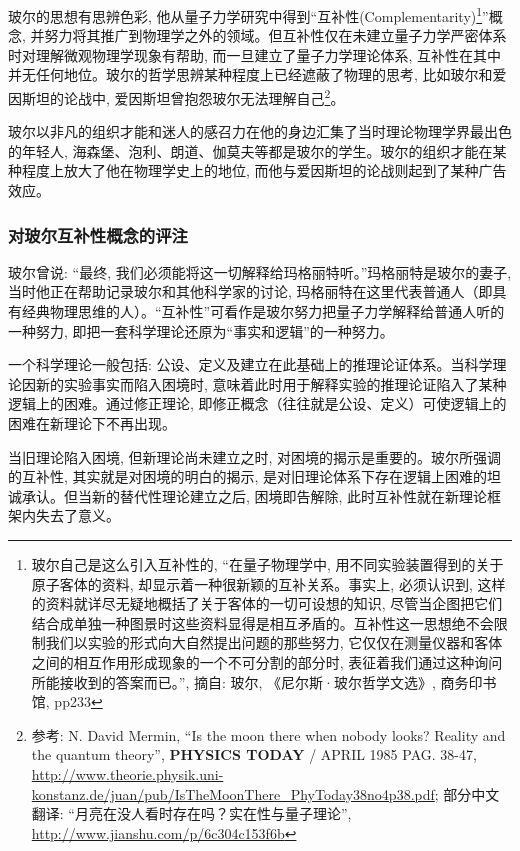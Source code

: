 
玻尔的思想有思辨色彩,
他从量子力学研究中得到``互补性(Complementarity)\footnote{玻尔自己是这么引入互补性的,
``在量子物理学中, 用不同实验装置得到的关于原子客体的资料,
却显示着一种很新颖的互补关系。事实上, 必须认识到,
这样的资料就详尽无疑地概括了关于客体的一切可设想的知识,
尽管当企图把它们结合成单独一种图景时这些资料显得是相互矛盾的。互补性这一思想绝不会限制我们以实验的形式向大自然提出问题的那些努力,
它仅仅在测量仪器和客体之间的相互作用形成现象的一个不可分割的部分时,
表征着我们通过这种询问所能接收到的答案而已。'', 摘自: 玻尔,
《尼尔斯·玻尔哲学文选》, 商务印书馆, pp233}''概念,
并努力将其推广到物理学之外的领域。但互补性仅在未建立量子力学严密体系时对理解微观物理学现象有帮助,
而一旦建立了量子力学理论体系,
互补性在其中并无任何地位。玻尔的哲学思辨某种程度上已经遮蔽了物理的思考,
比如玻尔和爱因斯坦的论战中,
爱因斯坦曾抱怨玻尔无法理解自己\footnote{参考: N. David Mermin, ``Is
the moon there when nobody looks? Reality and the quantum theory'',
\textbf{PHYSICS TODAY} / APRIL 1985 PAG. 38-47,
\url{http://www.theorie.physik.uni-konstanz.de/juan/pub/IsTheMoonThere_PhyToday38no4p38.pdf}; 部分中文翻译:
``月亮在没人看时存在吗？实在性与量子理论'',
\url{http://www.jianshu.com/p/6c304c153f6b}}。

玻尔以非凡的组织才能和迷人的感召力在他的身边汇集了当时理论物理学界最出色的年轻人,
海森堡、泡利、朗道、伽莫夫等都是玻尔的学生。玻尔的组织才能在某种程度上放大了他在物理学史上的地位,
而他与爱因斯坦的论战则起到了某种广告效应。

\subsubsection{对玻尔互补性概念的评注}

玻尔曾说: ``最终,
我们必须能将这一切解释给玛格丽特听。''玛格丽特是玻尔的妻子,
当时他正在帮助记录玻尔和其他科学家的讨论,
玛格丽特在这里代表普通人（即具有经典物理思维的人）。``互补性''可看作是玻尔努力把量子力学解释给普通人听的一种努力,
即把一套科学理论还原为``事实和逻辑''的一种努力。

一个科学理论一般包括:
公设、定义及建立在此基础上的推理论证体系。当科学理论因新的实验事实而陷入困境时,
意味着此时用于解释实验的推理论证陷入了某种逻辑上的困难。通过修正理论,
即修正概念（往往就是公设、定义）可使逻辑上的困难在新理论下不再出现。

当旧理论陷入困境, 但新理论尚未建立之时,
对困境的揭示是重要的。玻尔所强调的互补性,
其实就是对困境的明白的揭示,
是对旧理论体系下存在逻辑上困难的坦诚承认。但当新的替代性理论建立之后,
困境即告解除, 此时互补性就在新理论框架内失去了意义。

